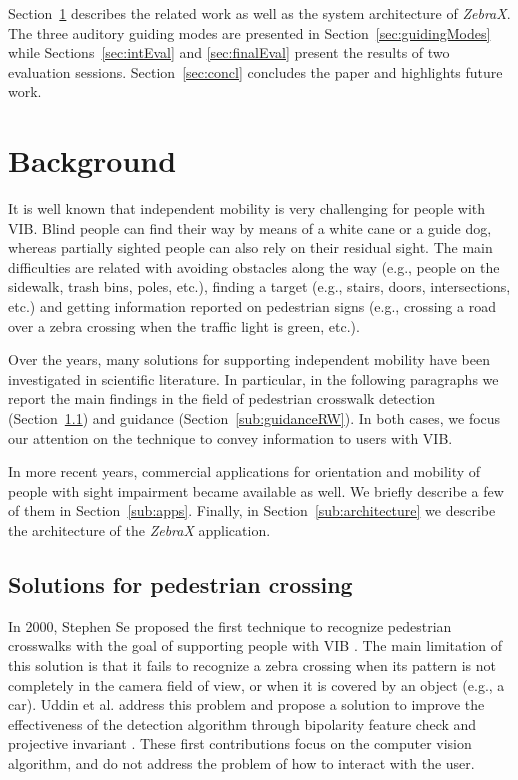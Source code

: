 \documentclass{article}
\newcommand{\zebra}{\emph{ZebraX}}
\begin{document}
Section~\ref{sec:background} describes the related work as well as the system architecture of \zebra{}. The three auditory guiding modes are presented in Section~\ref{sec:guidingModes} while Sections~\ref{sec:intEval} and \ref{sec:finalEval} present the results of two evaluation sessions. Section~\ref{sec:concl} concludes the paper and highlights future work.



\section{Background}
\label{sec:background}
It is well known that independent mobility is very challenging for people with VIB.
Blind people can find their way by means of a white cane or a guide dog, whereas partially sighted people can also rely on their residual sight.
The main difficulties are related with avoiding obstacles along the way (e.g., people on the sidewalk, trash bins, poles, etc.), finding a target (e.g., stairs, doors, intersections, etc.) and getting information reported on pedestrian signs (e.g., crossing a road over a zebra crossing when the traffic light is green, etc.).

Over the years, many solutions for supporting independent mobility have been investigated in scientific literature. In particular, in the following paragraphs we report the main findings in the field of pedestrian crosswalk detection (Section~\ref{sub:pedestrianRW}) and guidance (Section~\ref{sub:guidanceRW}).
In both cases, we focus our attention on the technique to convey information to users with VIB. 

In more recent years, commercial applications for orientation and mobility of people with sight impairment became available as well. We briefly describe a few of them in Section~\ref{sub:apps}.
Finally, in Section~\ref{sub:architecture} we describe the architecture of the \zebra{} application.

\subsection{Solutions for pedestrian crossing}
\label{sub:pedestrianRW}
In 2000, Stephen Se proposed the first technique to recognize pedestrian crosswalks with the goal of supporting people with VIB \cite{se}.
The main limitation of this solution is that it fails to recognize a zebra crossing when its pattern is not completely in the camera field of view, or when it is covered by an object (e.g., a car).
Uddin et al. address this problem and propose a solution to improve the effectiveness of the detection algorithm through bipolarity feature check and projective invariant \cite{uddin1,uddin2}.
These first contributions focus on the computer vision algorithm, and do not address the problem of how to interact with the user.
\end{document}
